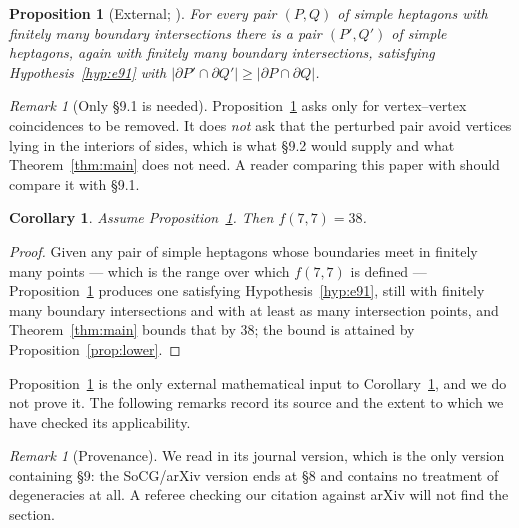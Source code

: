 \documentclass[11pt,a4paper]{article}
\theoremstyle{plain}
\newtheorem{proposition}[theorem]{Proposition}
\newtheorem{corollary}[theorem]{Corollary}
\theoremstyle{definition}
\theoremstyle{remark}
\newtheorem{remark}[theorem]{Remark}
\begin{document}
\begin{proposition}[External; ]\label{prop:reduction}
For every pair $(P,Q)$ of simple heptagons with finitely many boundary
intersections there is a pair $(P',Q')$ of simple heptagons, again with
finitely many boundary intersections, satisfying Hypothesis~\ref{hyp:e91} with
$\lvert\partial P'\cap\partial Q'\rvert \ge \lvert\partial P\cap\partial Q\rvert$.
\end{proposition}

\begin{remark}[Only \S9.1 is needed]
Proposition~\ref{prop:reduction} asks only for vertex--vertex coincidences to
be removed. It does \emph{not} ask that the perturbed pair avoid vertices lying
in the interiors of sides, which is what \S9.2 would supply and what
Theorem~\ref{thm:main} does not need. A reader comparing this paper with
\cite{AckermanKeszeghRote2022} should compare it with \S9.1.
\end{remark}

\begin{corollary}\label{cor:f77}
Assume Proposition~\ref{prop:reduction}. Then $f(7,7)=38$.
\end{corollary}

\begin{proof}
Given any pair of simple heptagons whose boundaries meet in finitely many
points --- which is the range over which $f(7,7)$ is defined ---
Proposition~\ref{prop:reduction} produces one satisfying
Hypothesis~\ref{hyp:e91}, still with finitely many boundary intersections and
with at least as many intersection points, and Theorem~\ref{thm:main} bounds
that by $38$; the bound is attained by Proposition~\ref{prop:lower}.
\end{proof}

\noindent
Proposition~\ref{prop:reduction} is the only external mathematical input to
Corollary~\ref{cor:f77}, and we do not prove it. The following remarks record
its source and the extent to which we have checked its applicability.

\begin{remark}[Provenance]
We read \cite{AckermanKeszeghRote2022} in its journal version, which is the only
version containing \S9: the SoCG/arXiv version \cite{AckermanKeszeghRote2020}
ends at \S8 and contains no treatment of degeneracies at all. A referee checking
our citation against arXiv will not find the section.
\end{remark}
\end{document}
